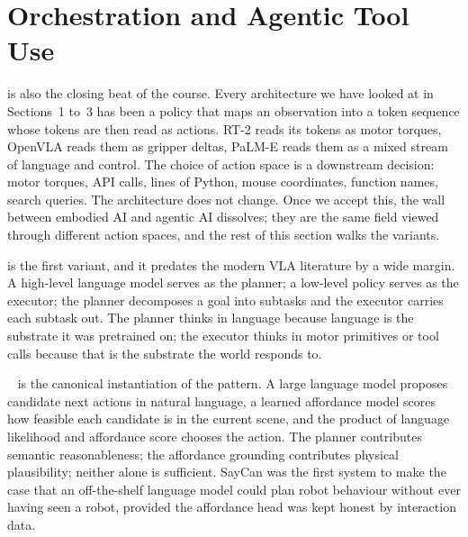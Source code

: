 
\section{Orchestration and Agentic Tool Use}


 is also the closing beat of the course. Every architecture we have looked at in Sections~1 to~3 has been a policy that maps an observation into a token sequence whose tokens are then read as actions. RT-2 reads its tokens as motor torques, OpenVLA reads them as gripper deltas, PaLM-E reads them as a mixed stream of language and control. The choice of action space is a downstream decision: motor torques, API calls, lines of Python, mouse coordinates, function names, search queries. The architecture does not change. Once we accept this, the wall between embodied AI and agentic AI dissolves; they are the same field viewed through different action spaces, and the rest of this section walks the variants.

\vspace{2.5em}

 is the first variant, and it predates the modern VLA literature by a wide margin. A high-level language model serves as the planner; a low-level policy serves as the executor; the planner decomposes a goal into subtasks and the executor carries each subtask out. The planner thinks in language because language is the substrate it was pretrained on; the executor thinks in motor primitives or tool calls because that is the substrate the world responds to.

~\cite{Ahn2022SayCan} is the canonical instantiation of the pattern. A large language model proposes candidate next actions in natural language, a learned affordance model scores how feasible each candidate is in the current scene, and the product of language likelihood and affordance score chooses the action. The planner contributes semantic reasonableness; the affordance grounding contributes physical plausibility; neither alone is sufficient. SayCan was the first system to make the case that an off-the-shelf language model could plan robot behaviour without ever having seen a robot, provided the affordance head was kept honest by interaction data.

